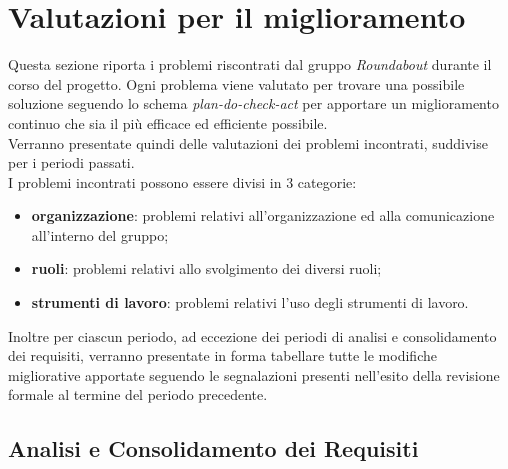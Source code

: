 \section{Valutazioni per il miglioramento}
	Questa sezione riporta i problemi riscontrati dal gruppo \textit{Roundabout} durante il corso del progetto. Ogni problema viene valutato per trovare una possibile soluzione seguendo lo schema \textit{plan-do-check-act} per apportare un miglioramento continuo che sia il più efficace ed efficiente possibile. \\
	Verranno presentate quindi delle valutazioni dei problemi incontrati, suddivise per i periodi passati. \\
		I problemi incontrati possono essere divisi in 3 categorie:
		\begin{itemize}
			\item \textbf{organizzazione}: problemi relativi all'organizzazione ed alla comunicazione all'interno del gruppo;
			\item \textbf{ruoli}: problemi relativi allo svolgimento dei diversi ruoli;
			\item \textbf{strumenti di lavoro}: problemi relativi l'uso degli strumenti di lavoro.
		\end{itemize}
	Inoltre per ciascun periodo, ad eccezione dei periodi di analisi e consolidamento dei requisiti, verranno presentate in forma tabellare tutte le modifiche migliorative apportate seguendo le segnalazioni presenti nell'esito della revisione formale al termine del periodo precedente.
	

	\subsection{Analisi e Consolidamento dei Requisiti}
	
